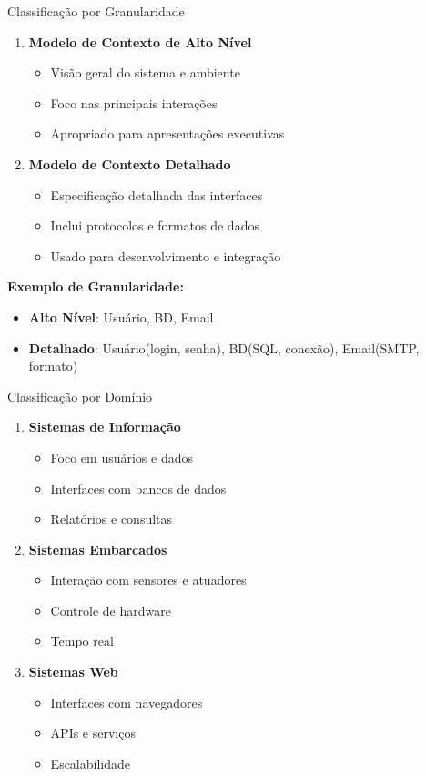 \documentclass[aspectratio=169]{beamer}
\begin{document}
\begin{frame}{Classificação por Granularidade}
\begin{enumerate}
\item \textbf{Modelo de Contexto de Alto Nível}
\begin{itemize}
\item Visão geral do sistema e ambiente
\item Foco nas principais interações
\item Apropriado para apresentações executivas
\end{itemize}

\item \textbf{Modelo de Contexto Detalhado}
\begin{itemize}
\item Especificação detalhada das interfaces
\item Inclui protocolos e formatos de dados
\item Usado para desenvolvimento e integração
\end{itemize}
\end{enumerate}

\vspace{0.5cm}
\textbf{Exemplo de Granularidade:}
\begin{itemize}
\item \textbf{Alto Nível}: Usuário, BD, Email
\item \textbf{Detalhado}: Usuário(login, senha), BD(SQL, conexão), Email(SMTP, formato)
\end{itemize}
\end{frame}

\begin{frame}{Classificação por Domínio}
\begin{enumerate}
\item \textbf{Sistemas de Informação}
\begin{itemize}
\item Foco em usuários e dados
\item Interfaces com bancos de dados
\item Relatórios e consultas
\end{itemize}

\item \textbf{Sistemas Embarcados}
\begin{itemize}
\item Interação com sensores e atuadores
\item Controle de hardware
\item Tempo real
\end{itemize}

\item \textbf{Sistemas Web}
\begin{itemize}
\item Interfaces com navegadores
\item APIs e serviços
\item Escalabilidade
\end{itemize}
\end{enumerate}
\end{frame}
\end{document}
